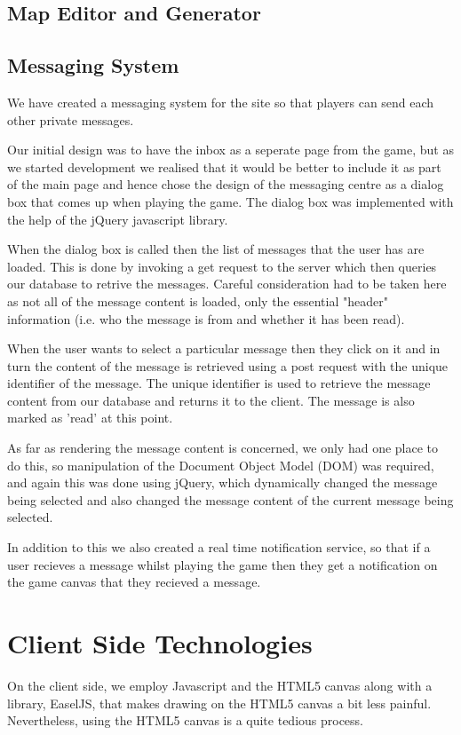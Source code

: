 \documentclass[a4paper,11pt]{article}
\begin{document}
		\subsection{Map Editor and Generator}
		
		\subsection{Messaging System}
		We have created a messaging system for the site so that players can send each other private messages.

		Our initial design was to have the inbox as a seperate page from the game, but as we started development we realised that it would be better to include it as part of the main page and hence chose the design of the messaging centre as a dialog box that comes up when playing the game.
		The dialog box was implemented with the help of the jQuery javascript library.

		When the dialog box is called then the list of messages that the user has are loaded. This is done by invoking a get request to the server which then queries our database to retrive the messages. Careful consideration had to be taken here as not all of the message content is loaded, only the essential "header" information (i.e. who the message is from and whether it has been read).

		When the user wants to select a particular message then they click on it and in turn the content of the message is retrieved using a post request with the unique identifier of the message. The unique identifier is used to retrieve the message content from our database and returns it to the client. The message is also marked as 'read' at this point.

		As far as rendering the message content is concerned, we only had one place to do this, so manipulation of the Document Object Model (DOM) was required, and again this was done using jQuery, which dynamically changed the message being selected and also changed the message content of the current message being selected.

		In addition to this we also created a real time notification service, so that if a user recieves a message whilst playing the game then they get a notification on the game canvas that they recieved a message.
		
		
	
	\section{Client Side Technologies}
		On the client side, we employ Javascript and the HTML5 canvas along with a library, EaselJS, that makes drawing on the HTML5 canvas a bit less painful. Nevertheless, using the HTML5 canvas is a quite tedious process.
	
\end{document}
